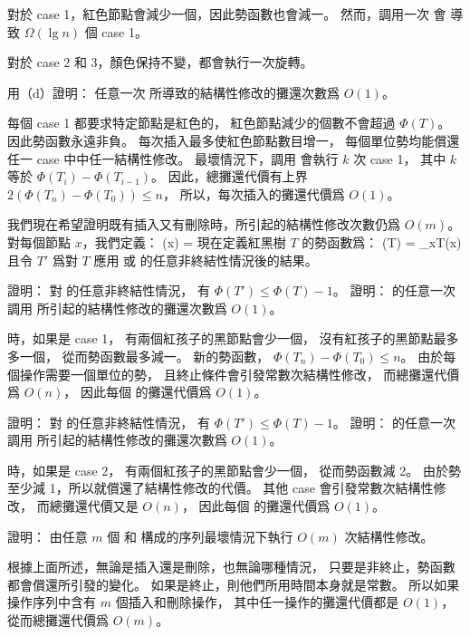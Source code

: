 \startANSWER
對於 case 1，紅色節點會減少一個，因此勢函數也會減一。
然而，調用一次  會
導致 $\Omega(\lg n)$ 個 case 1。

對於 case 2 和 3，顏色保持不變，都會執行一次旋轉。
\stopANSWER

\startigBase[continue]\startitem
用（d）證明：
任意一次  所導致的結構性修改的攤還次數爲 $O(1)$。
\stopitem\stopigBase

\startANSWER
每個 case 1 都要求特定節點是紅色的，
紅色節點減少的個數不會超過 $\Phi(T)$。
因此勢函數永遠非負。
每次插入最多使紅色節點數目增一，
每個單位勢均能償還任一 case 中中任一結構性修改。
最壞情況下，調用  會執行 $k$ 次 case 1，
其中 $k$ 等於 $\Phi(T_i)-\Phi(T_{i-1})$。
因此，總攤還代價有上界 $2(\Phi(T_n)-\Phi(T_0))\le n$，
所以，每次插入的攤還代價爲 $O(1)$。
\stopANSWER

我們現在希望證明既有插入又有刪除時，所引起的結構性修改次數仍爲 $O(m)$。
對每個節點 $x$，我們定義：
\startformula
\omega(x) = \startcases
{} \NC {} \NR
{} \NC {} \NR
{} \NC {} \NR
{} \NC {} \NR
\stopcases
\stopformula
現在定義紅黑樹 $T$ 的勢函數爲：
\startformula
\Phi(T) = \sum_{x\in T}\omega(x)
\stopformula
且令 $T'$ 爲對 $T$ 應用  或
  的任意非終結性情況後的結果。

\startigBase[continue]\startitem
證明：
對  的任意非終結性情況，
有 $\Phi(T')\le \Phi(T) - 1$。
證明：  的任意一次調用
所引起的結構性修改的攤還次數爲 $O(1)$。
\stopitem\stopigBase

\startANSWER
{} 時，如果是 case 1，
有兩個紅孩子的黑節點會少一個，
沒有紅孩子的黑節點最多多一個，
從而勢函數最多減一。
新的勢函數， $\Phi(T_n)-\Phi(T_0)\le n$。
由於每個操作需要一個單位的勢，
且終止條件會引發常數次結構性修改，
而總攤還代價爲 $O(n)$，
因此每個  的攤還代價爲 $O(1)$。
\stopANSWER

\startigBase[continue]\startitem
證明：
對  的任意非終結性情況，
有 $\Phi(T')\le \Phi(T) - 1$。
證明：  的任意一次調用
所引起的結構性修改的攤還次數爲 $O(1)$。
\stopitem\stopigBase

\startANSWER
{} 時，如果是 case 2，
有兩個紅孩子的黑節點會少一個，
從而勢函數減 2。
由於勢至少減 1，所以就償還了結構性修改的代價。
其他 case 會引發常數次結構性修改，
而總攤還代價又是 $O(n)$，
因此每個  的攤還代價爲 $O(1)$。
\stopANSWER

\startigBase[continue]\startitem
證明：
由任意 $m$ 個  和
  構成的序列最壞情況下執行 $O(m)$ 次結構性修改。
\stopitem\stopigBase

\startANSWER
根據上面所述，無論是插入還是刪除，也無論哪種情況，
只要是非終止，勢函數都會償還所引發的變化。
如果是終止，則他們所用時間本身就是常數。
所以如果操作序列中含有 $m$ 個插入和刪除操作，
其中任一操作的攤還代價都是 $O(1)$，
從而總攤還代價爲 $O(m)$。
\stopANSWER

\stopPROBLEM
